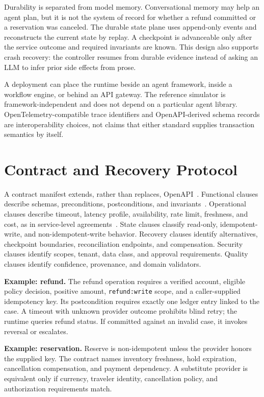 \documentclass[10pt,journal,compsoc]{IEEEtran}
\begin{document}
Durability is separated from model memory. Conversational memory may help an agent plan, but it is not the system of record for whether a refund committed or a reservation was canceled. The durable state plane uses append-only events and reconstructs the current state by replay. A checkpoint is advanceable only after the service outcome and required invariants are known. This design also supports crash recovery: the controller resumes from durable evidence instead of asking an LLM to infer prior side effects from prose.

A deployment can place the runtime beside an agent framework, inside a workflow engine, or behind an API gateway. The reference simulator is framework-independent and does not depend on a particular agent library. OpenTelemetry-compatible trace identifiers and OpenAPI-derived schema records are interoperability choices, not claims that either standard supplies transaction semantics by itself.

\section{Contract and Recovery Protocol}\label{sec:protocol}
A contract manifest extends, rather than replaces, OpenAPI~\cite{openapi311}. Functional clauses describe schemas, preconditions, postconditions, and invariants~\cite{meyer1992dbc}. Operational clauses describe timeout, latency profile, availability, rate limit, freshness, and cost, as in service-level agreements~\cite{keller2003wsla}. State clauses classify read-only, idempotent-write, and non-idempotent-write behavior. Recovery clauses identify alternatives, checkpoint boundaries, reconciliation endpoints, and compensation. Security clauses identify scopes, tenant, data class, and approval requirements. Quality clauses identify confidence, provenance, and domain validators.

\textbf{Example: refund.} The refund operation requires a verified account, eligible policy decision, positive amount, \texttt{refund:write} scope, and a caller-supplied idempotency key. Its postcondition requires exactly one ledger entry linked to the case. A timeout with unknown provider outcome prohibits blind retry; the runtime queries refund status. If committed against an invalid case, it invokes reversal or escalates.

\textbf{Example: reservation.} Reserve is non-idempotent unless the provider honors the supplied key. The contract names inventory freshness, hold expiration, cancellation compensation, and payment dependency. A substitute provider is equivalent only if currency, traveler identity, cancellation policy, and authorization requirements match.
\end{document}

